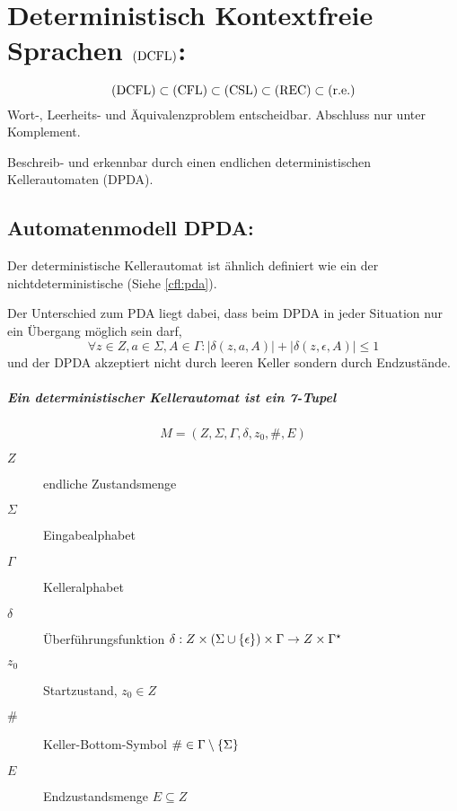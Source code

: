 \chapter{Deterministisch Kontextfreie Sprachen $\mathrm{(DCFL)}$:}
\begin{equation*}
	\mathrm{(DCFL)}\subset\mathrm{(CFL)}\subset\mathrm{(CSL)}\subset\mathrm{(REC)}\subset\mathrm{(r.e.)}
\end{equation*}
Wort-, Leerheits- und Äquivalenzproblem entscheidbar. Abschluss nur unter Komplement.

Beschreib- und erkennbar durch einen endlichen deterministischen Kellerautomaten (DPDA).



\section{Automatenmodell DPDA:}\label{dcfl:dpda}
Der deterministische Kellerautomat ist ähnlich definiert wie ein der nichtdeterministische (Siehe \autoref{cfl:pda}).

Der Unterschied zum PDA liegt dabei, dass beim DPDA in jeder Situation nur ein Übergang möglich sein darf,
\begin{equation*}
	\forall z\in Z, a\in\Sigma, A\in\Gamma : |\delta(z,a,A)|+|\delta(z,\epsilon,A)|\leq 1
\end{equation*}
und der DPDA akzeptiert nicht durch leeren Keller sondern durch Endzustände.

\paragraph{Ein deterministischer Kellerautomat ist ein 7-Tupel}
\begin{equation*}
	M=(Z,\Sigma,\Gamma,\delta,z_0,\#, E)
\end{equation*}
\begin{description}
	\item[$Z$] endliche Zustandsmenge
	\item[$\Sigma$] Eingabealphabet
	\item[$\Gamma$] Kelleralphabet
	\item[$\delta$] Überführungsfunktion $\delta:Z\times(\Sigma\cup\left\{ \epsilon \right\})\times\Gamma \rightarrow Z\times\Gamma^\star$
	\item[$z_0$] Startzustand, $z_0\in Z$
	\item[$\#$] Keller-Bottom-Symbol $\#\in \Gamma\setminus\left\{ \Sigma \right\}$
	\item[$E$] Endzustandsmenge $E\subseteq Z$
\end{description}

